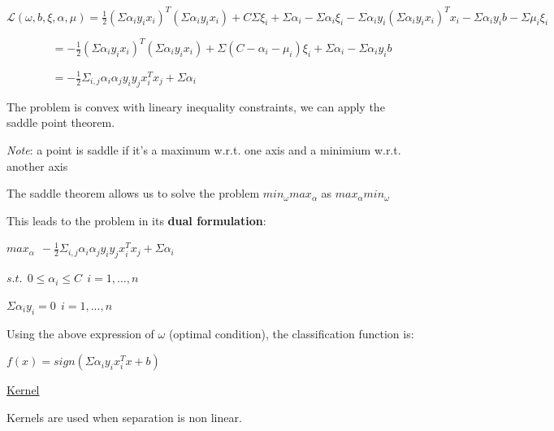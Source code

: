 $\mathcal{L}(\omega,b,\xi, \alpha, \mu) = \frac{1}{2}(\Sigma \alpha_i y_i x_i)^T(\Sigma \alpha_i y_i x_i)+C\Sigma \xi_i + \Sigma \alpha_i - \Sigma \alpha_i \xi_i - \Sigma \alpha_i y_i (\Sigma \alpha_i y_i x_i)^T x_i - \Sigma \alpha_i y_i b - \Sigma \mu_i \xi_i$

$~~~~~~~~~~~~~~~~~~ = -\frac{1}{2}(\Sigma \alpha_i y_i x_i)^T(\Sigma \alpha_i y_i x_i) + \Sigma(C - \alpha_i - \mu_i)\xi_i + \Sigma \alpha_i - \Sigma \alpha_i y_i b$

$~~~~~~~~~~~~~~~~~~ = -\frac{1}{2}\Sigma_{i,j} \alpha_i \alpha_j y_i y_j x_i^T x_j + \Sigma \alpha_i$

\vspace{5mm}

The problem is convex with lineary inequality constraints, we can apply the saddle point theorem.

\textit{Note}: a point is saddle if it's a maximum w.r.t. one axis and a minimium w.r.t. another axis 

The saddle theorem allows us to solve the problem $min_\omega max_\alpha$ as $max_\alpha min_\omega$

\vspace{5mm}

This leads to the problem in its \textbf{dual formulation}:

\begin{center}

$max_\alpha~~-\frac{1}{2}\Sigma_{i,j} \alpha_i \alpha_j y_i y_j x_i^T x_j + \Sigma \alpha_i$

$s.t.~~0 \leq \alpha_i \leq C~~i=1,...,n$

$\Sigma \alpha_i y_i = 0~~i=1,...,n$

\end{center}

\vspace{5mm}

Using the above expression of $\omega$ (optimal condition), the classification function is:

\begin{center}
$f(x)=sign(\Sigma \alpha_i y_i x_i^T x + b)$
\end{center}

\vspace{5mm}

\underline{Kernel}

\vspace{5mm}

Kernels are used when separation is non linear.

